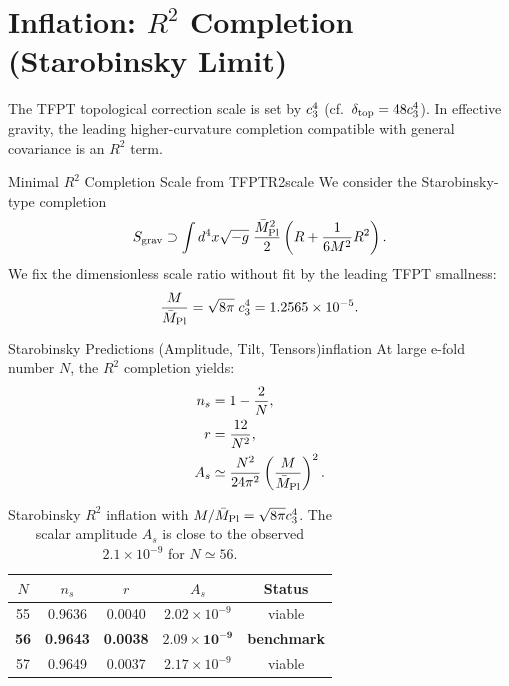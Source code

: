 \section{Inflation: $R^2$ Completion (Starobinsky Limit)}

The TFPT topological correction scale is set by $c_3^4$ (cf.\ $\delta_{\mathrm{top}} = 48c_3^4$). 
In effective gravity, the leading higher-curvature completion compatible with general covariance is an $R^2$ term.

\begin{definition}{Minimal $R^2$ Completion Scale from TFPT}{R2scale}
We consider the Starobinsky-type completion
\begin{equation}
    S_{\text{grav}} \supset \int d^4x\sqrt{-g}\;\frac{\bar{M}_{\mathrm{Pl}}^2}{2}\left(R + \frac{1}{6M^2}R^2\right).
    \label{eq:R2action}
\end{equation}
We fix the dimensionless scale ratio without fit by the leading TFPT smallness:
\begin{equation}
    \frac{M}{\bar{M}_{\mathrm{Pl}}}=\sqrt{8\pi}\;c_3^4
    = 1.2565\times 10^{-5}.
    \label{eq:R2scale}
\end{equation}
\end{definition}

\begin{theorem}{Starobinsky Predictions (Amplitude, Tilt, Tensors)}{inflation}
At large e-fold number $N$, the $R^2$ completion yields:
\begin{align}
    n_s &= 1 - \frac{2}{N}, \label{eq:ns}\\
    r &= \frac{12}{N^2}, \label{eq:r}\\
    A_s &\simeq \frac{N^2}{24\pi^2}\left(\frac{M}{\bar{M}_{\mathrm{Pl}}}\right)^2. \label{eq:As}
\end{align}
\end{theorem}

\begin{table}[H]
\centering
\begin{tabular}{@{}ccccc@{}}
\toprule
$N$ & $n_s$ & $r$ & $A_s$ & \textbf{Status}\\
\midrule
55 & 0.9636 & 0.0040 & $2.02\times10^{-9}$ & viable\\
\textbf{56} & \textbf{0.9643} & \textbf{0.0038} & $\mathbf{2.09\times10^{-9}}$ & \textbf{benchmark}\\
57 & 0.9649 & 0.0037 & $2.17\times10^{-9}$ & viable\\
\bottomrule
\end{tabular}
\caption{Starobinsky $R^2$ inflation with $M/\bar{M}_{\mathrm{Pl}}=\sqrt{8\pi}c_3^4$. The scalar amplitude $A_s$ is close to the observed $2.1\times10^{-9}$ for $N\simeq 56$.}
\label{tab:inflation}
\end{table}

